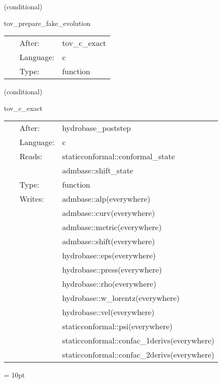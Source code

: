 \vspace{5mm}

\noindent {\bf }   (conditional) 

\hspace{5mm} tov\_prepare\_fake\_evolution 

\hspace{5mm}{\it prepare for fake evolution } 


\hspace{5mm}

 \begin{tabular*}{160mm}{cll} 
~ & After:  & tov\_c\_exact \\ 
~ & Language:  & c \\ 
~ & Type:  & function \\ 
\end{tabular*} 


\vspace{5mm}

   (conditional) 

\hspace{5mm} tov\_c\_exact 

\hspace{5mm}{\it use fake evolution } 


\hspace{5mm}

 \begin{tabular*}{160mm}{cll} 
~ & After:  & hydrobase\_poststep \\ 
~ & Language:  & c \\ 
~ & Reads:  & staticconformal::conformal\_state \\ 
~& ~ &admbase::shift\_state\\ 
~ & Type:  & function \\ 
~ & Writes:  & admbase::alp(everywhere) \\ 
~& ~ &admbase::curv(everywhere)\\ 
~& ~ &admbase::metric(everywhere)\\ 
~& ~ &admbase::shift(everywhere)\\ 
~& ~ &hydrobase::eps(everywhere)\\ 
~& ~ &hydrobase::press(everywhere)\\ 
~& ~ &hydrobase::rho(everywhere)\\ 
~& ~ &hydrobase::w\_lorentz(everywhere)\\ 
~& ~ &hydrobase::vel(everywhere)\\ 
~& ~ &staticconformal::psi(everywhere)\\ 
~& ~ &staticconformal::confac\_1derivs(everywhere)\\ 
~& ~ &staticconformal::confac\_2derivs(everywhere)\\ 
\end{tabular*} 



\vspace{5mm}\parskip = 10pt 
